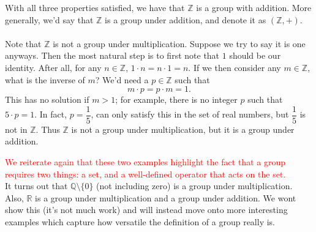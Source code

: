 \documentclass[12pt,letterpaper]{algebra_book}
\newcommand{\ZZ}{\mathbb{Z}}
\theoremstyle{definition}
\begin{document}
With all three properties satisfied, we have that $\mathbb{Z}$ is a
group with addition. More generally, we'd say that $\mathbb{Z}$ is a
group under addition, and denote it as $(\mathbb{Z}, +)$.
\\
\\
{\color{Plum} 
Note that $\mathbb{Z}$ is not a group under multiplication. Suppose we
try to say it is one anyways. Then the most natural step is to first note that $1$
should be our identity. After all, for any $n \in \mathbb{Z}$, $1
\cdot n = n \cdot 1 = n$. If we then consider any $m \in \mathbb{Z}$,
what is the inverse of $m$? We'd need a $p \in
\mathbb{Z}$ such that 
\[
    m\cdot p = p\cdot m = 1.
\]
This has no solution if $m > 1$; for example, there is no integer $p$ 
such that $5 \cdot p = 1$. In fact, $p = \dfrac{1}{5}$, can only
satisfy this in the set of real numbers, but $\dfrac{1}{5}$ is not
in $\mathbb{Z}$. Thus $\ZZ$ is not a group under multiplication, but
it is a group under addition.
}

\textcolor{red}{We reiterate again that these two examples highlight the fact that a
group requires two things: a set, and a well-defined operator that
acts on the set.}
\\

It turns out that $\mathbb{Q}\setminus\{0\}$ (not including zero) is a group under
multiplication. Also, $\mathbb{R}$ is a group under multiplication and
a group under addition. We wont show this (it's not much work) and
will instead move onto more interesting examples which capture how
versatile the definition of a group really is. 
\end{document}
